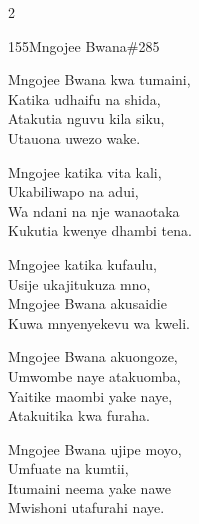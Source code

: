 \begin{multicols}{2}
\begin{hymn}{155}{Mngojee Bwana}{\#285}
\begin{stanza}
Mngojee Bwana kwa tumaini,\\
Katika udhaifu na shida,\\
Atakutia nguvu kila siku,\\
Utauona uwezo wake.
\end{stanza}
\begin{stanza}
Mngojee katika vita kali,\\
Ukabiliwapo na adui,\\
Wa ndani na nje wanaotaka\\
Kukutia kwenye dhambi tena.
\end{stanza}
\begin{stanza}
Mngojee katika kufaulu,\\
Usije ukajitukuza mno,\\
Mngojee Bwana akusaidie\\
Kuwa mnyenyekevu wa kweli.
\end{stanza}
\begin{stanza}
Mngojee Bwana akuongoze,\\
Umwombe naye atakuomba,\\
Yaitike maombi yake naye,\\
Atakuitika kwa furaha.
\end{stanza}
\begin{stanza}
Mngojee Bwana ujipe moyo,\\
Umfuate na kumtii,\\
Itumaini neema yake nawe\\
Mwishoni utafurahi naye.
\end{stanza}
\end{hymn}


\end{multicols}
